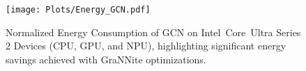 


\begin{figure}[t!]
\begin{center}
\texttt{[image: Plots/Energy\_GCN.pdf]}%
\end{center}
\caption{Normalized Energy Consumption of GCN on Intel\textregistered\ Core\texttrademark\ Ultra Series 2 Devices (CPU, GPU, and NPU), highlighting significant energy savings achieved with GraNNite optimizations.}\label{plot:energy_gcn}
\end{figure}